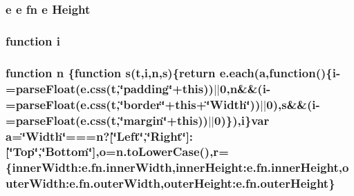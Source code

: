 \hypertarget{root_2static_2root_2js_2bootstrap_2jquery-ui-1_810_84_8custom_8min_8js_a1a6d2f0a7302d6ffa1db9fa5313e2705}{
\subsubsection[{Height}]{ {\bf e} {\bf e} {\bf fn} {\bf e} Height}}\label{root_2static_2root_2js_2bootstrap_2jquery-ui-1_810_84_8custom_8min_8js_a1a6d2f0a7302d6ffa1db9fa5313e2705}
\hypertarget{root_2static_2root_2js_2bootstrap_2jquery-ui-1_810_84_8custom_8min_8js_aba29173262d28394924f99eb2ed5b31b}{
\subsubsection[{i}]{\setlength{\rightskip}{0pt plus 5cm}function i}}\label{root_2static_2root_2js_2bootstrap_2jquery-ui-1_810_84_8custom_8min_8js_aba29173262d28394924f99eb2ed5b31b}
\hypertarget{root_2static_2root_2js_2bootstrap_2jquery-ui-1_810_84_8custom_8min_8js_afc984c4f6c68ce30a0af99006f5f8d27}{
\subsubsection[{n}]{\setlength{\rightskip}{0pt plus 5cm}function n \{function {\bf s}({\bf t},{\bf i},n,{\bf s})\{return {\bf e.\-each}({\bf a},function()\{{\bf i}-\/=parse\-Float(e.\-css({\bf t},\char`\"{}padding\char`\"{}+this))$\vert$$\vert$0,n\&\&({\bf i}-\/=parse\-Float(e.\-css({\bf t},\char`\"{}border\char`\"{}+this+\char`\"{}Width\char`\"{}))$\vert$$\vert$0),s\&\&({\bf i}-\/=parse\-Float(e.\-css({\bf t},\char`\"{}margin\char`\"{}+this))$\vert$$\vert$0)\}),{\bf i}\}var {\bf a}=\char`\"{}Width\char`\"{}===n?\mbox{[}\char`\"{}Left\char`\"{},\char`\"{}{\bf Right}\char`\"{}\mbox{]}\-:\mbox{[}\char`\"{}Top\char`\"{},\char`\"{}{\bf Bottom}\char`\"{}\mbox{]},o=n.\-to\-Lower\-Case(),{\bf r}=\{inner\-Width\-:e.\-fn.\-inner\-Width,inner\-Height\-:e.\-fn.\-inner\-Height,outer\-Width\-:e.\-fn.\-outer\-Width,outer\-Height\-:e.\-fn.\-outer\-Height\}}}\label{root_2static_2root_2js_2bootstrap_2jquery-ui-1_810_84_8custom_8min_8js_afc984c4f6c68ce30a0af99006f5f8d27}
